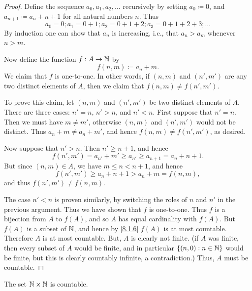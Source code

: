 \begin{proof}
  Define the sequence \(a_0, a_1, a_2, \dots\) recursively by setting \(a_0 \coloneqq 0\), and \(a_{n + 1} \coloneqq a_n + n + 1\) for all natural numbers \(n\).
  Thus
  \[
    a_0 = 0; a_1 = 0 + 1; a_2 = 0 + 1 + 2; a_3 = 0 + 1 + 2 + 3; \dots
  \]
  By induction one can show that \(a_n\) is increasing, i.e., that \(a_n > a_m\) whenever \(n > m\).

  Now define the function \(f : A \to \mathbb{N}\) by
  \[
    f(n, m) \coloneqq a_n + m.
  \]
  We claim that \(f\) is one-to-one.
  In other words, if \((n, m)\) and \((n', m')\) are any two distinct elements of \(A\), then we claim that \(f(n, m) \neq f(n', m')\).

  To prove this claim, let \((n, m)\) and \((n', m')\) be two distinct elements of \(A\).
  There are three cases: \(n' = n\), \(n' > n\), and \(n' < n\).
  First suppose that \(n' = n\).
  Then we must have \(m \neq m'\), otherwise \((n, m)\) and \((n', m')\) would not be distinct.
  Thus \(a_n + m \neq a_n + m'\), and hence \(f(n, m) \neq f(n', m')\), as desired.

  Now suppose that \(n' > n\).
  Then \(n' \geq n + 1\), and hence
  \[
    f(n', m') = a_{n'} + m' \geq a_{n'} \geq a_{n + 1} = a_n + n + 1.
  \]
  But since \((n, m) \in A\), we have \(m \leq n < n + 1\), and hence
  \[
    f(n', m') \geq a_n + n + 1 > a_n + m = f(n, m),
  \]
  and thus \(f(n', m') \neq f(n, m)\).

  The case \(n' < n\) is proven similarly, by switching the roles of \(n\) and \(n'\) in the previous argument.
  Thus we have shown that \(f\) is one-to-one.
  Thus \(f\) is a bijection from \(A\) to \(f(A)\), and so \(A\) has equal cardinality with \(f(A)\).
  But \(f(A)\) is a subset of \(\mathbb{N}\), and hence by \cref{8.1.6} \(f(A)\) is at most countable.
  Therefore \(A\) is at most countable.
  But, \(A\) is clearly not finite.
  (if \(A\) was finite, then every subset of \(A\) would be finite, and in particular \(\left\lbrace(n, 0) : n \in \mathbb{N}\right\rbrace\) would be finite, but this is clearly countably infinite, a contradiction.)
  Thus, \(A\) must be countable.
\end{proof}

\begin{cor}\label{8.1.13}
  The set \(\mathbb{N} \times \mathbb{N}\) is countable.
\end{cor}

